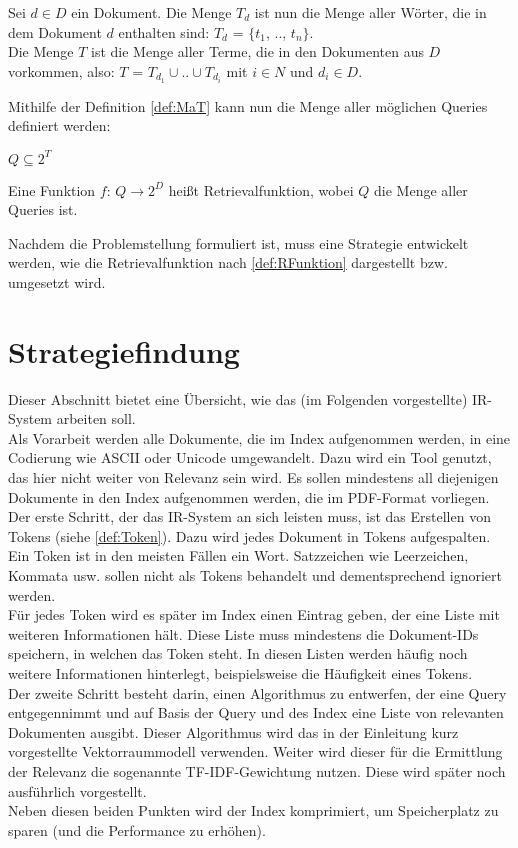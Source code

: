 \begin{defi}\label{def:MaT}
	Sei $d \in D$ ein Dokument. Die Menge $T_d$ ist nun die Menge aller Wörter, die in dem Dokument $d$ enthalten sind: $T_d$ = $\{$$t_1$, .., $t_n$$\}$.
	\\
	Die Menge $T$ ist die Menge aller Terme, die in den Dokumenten aus $D$ vorkommen, also:
	$T$ = $T_{d_1} \cup .. \cup T_{d_i}$ mit $i \in N$ und $d_i \in D$.
\end{defi}
Mithilfe der Definition \ref{def:MaT} kann nun die Menge aller möglichen Queries definiert werden:
\begin{defi}\label{def:MamQ}
	$Q \subseteq 2^T$
\end{defi}
\begin{defi}[Retrievalfunktion]\label{def:RFunktion}
	Eine Funktion $f$: $Q \rightarrow 2^D$ heißt Retrievalfunktion, wobei $Q$ die Menge aller Queries ist.
\end{defi}
Nachdem die Problemstellung formuliert ist, muss eine Strategie entwickelt werden, wie die Retrievalfunktion nach \cref{def:RFunktion} dargestellt bzw. umgesetzt wird.
\\
\section{Strategiefindung}
Dieser Abschnitt bietet eine Übersicht, wie das (im Folgenden vorgestellte) IR-System arbeiten soll.
\\
Als Vorarbeit werden alle Dokumente, die im Index aufgenommen werden, in eine Codierung wie ASCII oder Unicode umgewandelt. Dazu wird ein Tool genutzt, das hier nicht weiter von Relevanz sein wird.
Es sollen mindestens all diejenigen Dokumente in den Index aufgenommen werden, die im PDF-Format vorliegen.
\\
Der erste Schritt, der das IR-System an sich leisten muss, ist das Erstellen von Tokens (siehe \cref{def:Token}). Dazu wird jedes Dokument in Tokens aufgespalten. Ein Token ist in den meisten Fällen ein Wort. Satzzeichen wie Leerzeichen, Kommata usw. sollen nicht als Tokens behandelt und dementsprechend ignoriert werden.
\\
Für jedes Token wird es später im Index einen Eintrag geben, der eine Liste mit weiteren Informationen hält. Diese Liste muss mindestens die Dokument-IDs speichern, in welchen das Token steht. In diesen Listen werden häufig noch weitere Informationen hinterlegt, beispielsweise die Häufigkeit eines Tokens.
\\
Der zweite Schritt besteht darin, einen Algorithmus zu entwerfen, der eine Query entgegennimmt und auf Basis der Query und des Index eine Liste von relevanten Dokumenten ausgibt. Dieser Algorithmus wird das in der Einleitung kurz vorgestellte Vektorraummodell verwenden. Weiter wird dieser für die Ermittlung der Relevanz die sogenannte TF-IDF-Gewichtung nutzen. Diese wird später noch ausführlich vorgestellt.
\\
Neben diesen beiden Punkten wird der Index komprimiert, um Speicherplatz zu sparen (und die Performance zu erhöhen).

